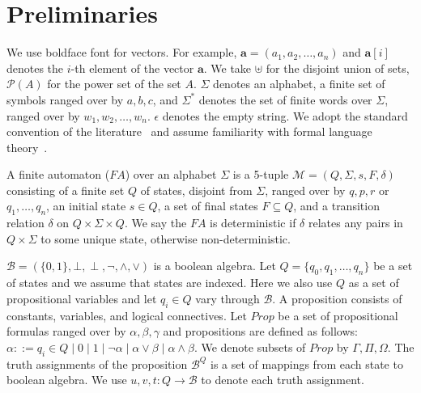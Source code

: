 \section{Preliminaries}

We use boldface font for vectors. For example, \( \mathbf{a} = (a_1, a_2,
\ldots, a_n) \) and \( \mathbf{a}[i] \) denotes the \( i \)-th element of the
vector \( \mathbf{a} \). We take \( \uplus \) for the disjoint union of sets, \(
\mathcal{P}(A) \) for the power set of the set \( A \). \( \Sigma \) denotes an
alphabet, a finite set of symbols ranged over by \( a, b, c \), and \( \Sigma^*
\) denotes the set of finite words over \( \Sigma \), ranged over by \( w_1,
w_2, \ldots, w_n \). \( \epsilon \) denotes the empty string. We adopt 
the
standard convention of the literature~\cite{Thomas:1997,tata2007} and 
assume
familiarity with formal language theory~\cite{Kozen:1997}.

A finite automaton (\( \mathit{FA} \)) over an alphabet \( \Sigma \) is 
a 5-tuple \( \mathcal{M} = (Q, \Sigma, s, F, \delta) \) consisting of a 
finite set \( Q \) of states, disjoint from \( \Sigma \), ranged over by 
\( q, p, r \) or \( q_1, \ldots , q_n \), an initial state \( s \in Q 
\), a set of final states \( F \subseteq Q \), and a transition relation 
\( \delta \) on \( Q \times \Sigma \times Q \). We say the 
\(\mathit{FA}\) is deterministic if \( \delta \) relates any pairs in \( 
Q \times \Sigma \) to some unique state, otherwise non-deterministic.

\( \mathcal{B} = (\{0, 1\}, \bot, \perp, \neg, \wedge, \vee) \) is a boolean
algebra. Let \( Q = \{ q_0, q_1, \ldots, q_n \} \) be a set of states 
and we assume
that states are indexed. Here we also use \( Q \) as a set of propositional
variables and let \( q_i \in Q \) vary through \( \mathcal{B} \). A proposition
consists of constants, variables, and logical connectives. Let \( \mathit{Prop}
\) be a set of propositional formulas ranged over by \( \alpha, \beta, \gamma \)
and propositions are defined as follows: \(\alpha ::= q_i \in Q \mid 0 \mid 1
\mid \neg \alpha \mid \alpha \vee \beta \mid \alpha \wedge \beta\). We denote
subsets of \( \mathit{Prop} \) by \( \Gamma, \Pi, \Omega \). The truth
assignments of the proposition \(\mathcal{B}^Q\) is a set of mappings from each
state to boolean algebra. We use \( u, v, t : Q \rightarrow \mathcal{B} \) to
denote each truth assignment.


